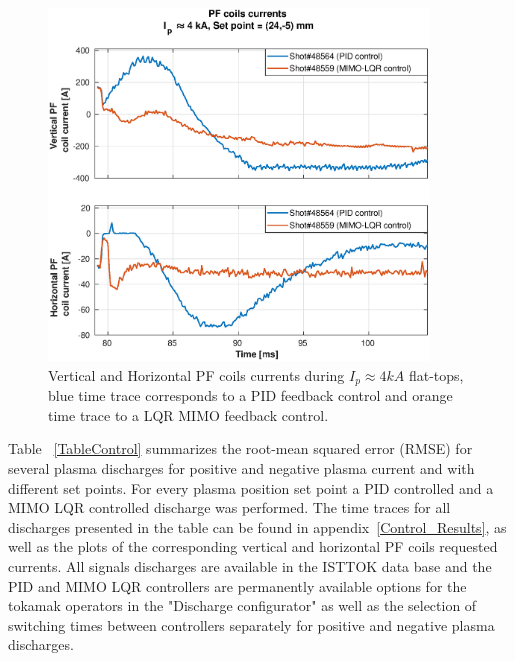 \begin{figure}[h]
	\centering
	\includegraphics[width=0.9\textwidth]{Chp5/PIDvsMIMO_564_559_curr_2.eps}
	\caption{Vertical and Horizontal PF coils currents during  $I_p\approx 4kA$  flat-tops, blue time trace corresponds to a PID feedback control and orange time trace to a LQR MIMO feedback control.\label{564_559curr}}
\end{figure}


 Table ~\ref{TableControl} summarizes the root-mean squared error (RMSE) for several plasma discharges for positive and negative plasma current and with different set points. For every plasma position set point a PID controlled and a MIMO LQR controlled discharge was performed. The time traces for all discharges presented in the table can be found in appendix~\ref{Control_Results}, as well as the plots of the corresponding vertical and horizontal PF coils requested currents. All signals discharges are available in the ISTTOK data base and the PID and MIMO LQR controllers are permanently available options for the tokamak operators in the "Discharge configurator" as well as the selection of switching times between controllers separately for positive and negative plasma discharges.\smallskip

